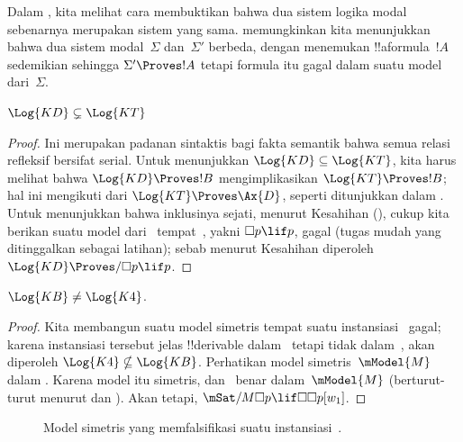 \documentclass[../../../include/open-logic-section]{subfiles}
\begin{document}


Dalam , kita melihat cara membuktikan bahwa dua sistem logika
modal sebenarnya merupakan sistem yang sama. 
memungkinkan kita menunjukkan bahwa dua sistem modal~$\Sigma$ dan~$\Sigma'$
berbeda, dengan menemukan !!a{formula}~$!A$ sedemikian sehingga
$\Sigma'\Proves !A$ tetapi formula itu gagal dalam suatu model dari~$\Sigma$.

\begin{prop}
  $\Log{KD} \subsetneq \Log{KT}$
\end{prop}

\begin{proof}
  Ini merupakan padanan sintaktis bagi fakta semantik bahwa semua relasi
  refleksif bersifat serial. Untuk menunjukkan
  $\Log{KD}\subseteq\Log{KT}$, kita harus melihat bahwa
  $\Log{KD}\Proves !B$ mengimplikasikan $\Log{KT}\Proves !B$; hal ini
  mengikuti dari $\Log{KT}\Proves\Ax{D}$, seperti ditunjukkan dalam
  . Untuk menunjukkan bahwa inklusinya sejati,
  menurut Kesahihan (), cukup kita berikan suatu
  model dari~ tempat~, yakni $\Box p\lif p$, gagal (tugas mudah
  yang ditinggalkan sebagai latihan); sebab menurut Kesahihan diperoleh
  $\Log{KD}\Proves/\Box p\lif p$.
\end{proof}

\begin{prop}
  $\Log{KB} \neq \Log{K4}$.
\end{prop}

\begin{proof}
  Kita membangun suatu model simetris tempat suatu instansiasi~ gagal;
  karena instansiasi tersebut jelas !!{derivable} dalam~ tetapi tidak
  dalam~, akan diperoleh $\Log{K4}\nsubseteq\Log{KB}$. Perhatikan
  model simetris~$\mModel{M}$ dalam . Karena model itu
  simetris,  dan~ benar dalam~$\mModel{M}$ (berturut-turut menurut
   dan
  ). Akan tetapi,
  $\mSat/{M}{\Box p\lif\Box\Box p}[w_1]$.
\end{proof}

\begin{figure}[htpb]
  \centering
  \caption{Model simetris yang memfalsifikasi suatu instansiasi~.}
\end{figure}
\end{document}
